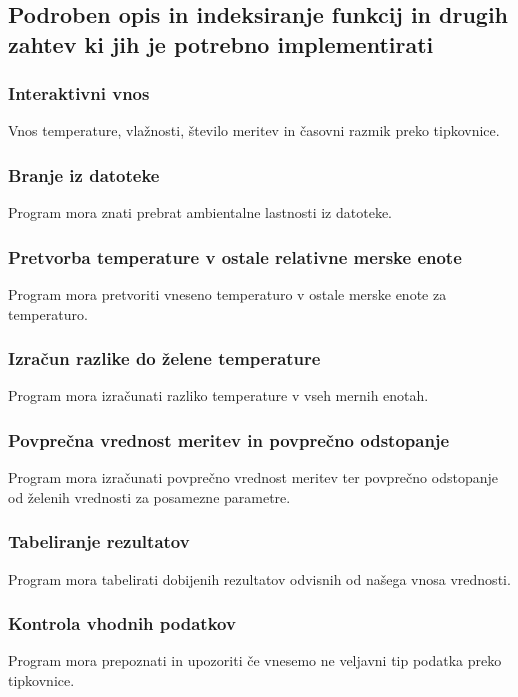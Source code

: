 \documentclass[a4paper,12pt]{article}
\begin{document}
		\subsection{Podroben opis in indeksiranje funkcij in drugih zahtev ki jih je potrebno implementirati}

			\subsubsection{Interaktivni vnos}
				\qquad \qquad Vnos temperature, vlažnosti, število meritev in časovni razmik preko tipkovnice.

			\subsubsection{Branje iz datoteke}
				\qquad \qquad Program mora znati prebrat ambientalne lastnosti iz datoteke.

			\subsubsection{Pretvorba temperature v ostale relativne merske enote}
				\qquad \qquad Program mora pretvoriti vneseno temperaturo v ostale merske enote za temperaturo.

			\subsubsection{Izračun razlike do želene temperature}
				\qquad \qquad Program mora izračunati razliko temperature v vseh mernih enotah.
			
			\subsubsection{Povprečna vrednost meritev in povprečno odstopanje}
				\qquad \qquad Program mora izračunati povprečno vrednost meritev ter povprečno odstopanje od 
				želenih vrednosti za posamezne parametre.

			\subsubsection{Tabeliranje rezultatov}
				\qquad \qquad Program mora tabelirati dobijenih rezultatov odvisnih od našega vnosa vrednosti.

			\subsubsection{Kontrola vhodnih podatkov}
				\qquad \qquad Program mora prepoznati in upozoriti če vnesemo ne veljavni tip podatka preko tipkovnice.
\end{document}
